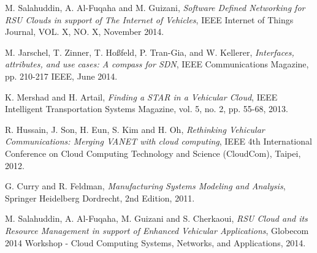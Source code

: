\documentclass[conference]{IEEEtran}
\begin{document}
\begin{thebibliography}{1}

M. Salahuddin, A. Al-Fuqaha and M. Guizani, \emph{\glqq Software Defined Networking for RSU Clouds in support of The Internet of Vehicles\grqq}, IEEE Internet of Things Journal, VOL. X, NO. X, November 2014.


M. Jarschel, T. Zinner, T. Hoßfeld, P. Tran-Gia, and W. Kellerer, \emph{\glqq Interfaces, attributes, and use cases: A compass for SDN\grqq}, IEEE Communications Magazine, pp. 210-217 IEEE, June 2014.


K. Mershad and H. Artail, \emph{\glqq Finding a STAR in a Vehicular Cloud\grqq}, IEEE
Intelligent Transportation Systems Magazine, vol. 5, no. 2, pp. 55-68, 2013.

R. Hussain, J. Son, H. Eun, S. Kim and H. Oh, \emph{\glqq Rethinking Vehicular
Communications: Merging VANET with cloud computing\grqq}, IEEE 4th
International Conference on Cloud Computing Technology and Science
(CloudCom), Taipei, 2012.

G. Curry and R. Feldman, \emph{\glqq Manufacturing Systems Modeling and Analysis\grqq}, Springer Heidelberg Dordrecht, 2nd Edition, 2011.

M. Salahuddin, A. Al-Fuqaha, M. Guizani and S. Cherkaoui, \emph{\glqq RSU Cloud and its Resource Management in
support of Enhanced Vehicular Applications\grqq}, Globecom 2014 Workshop - Cloud Computing Systems, Networks, and Applications, 2014.



\end{thebibliography}
\end{document}
